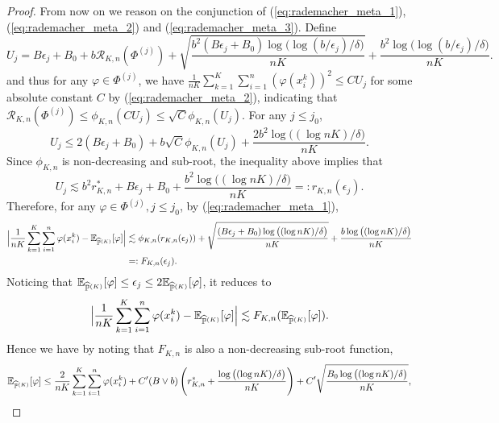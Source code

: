 \documentclass[11pt]{article}
\numberwithin{equation}{section}
\renewcommand{\P}{\mathbb{P}}
\renewcommand{\eqref}[1]{(\ref{#1})}
\begin{document}
\begin{proof}
    From now on we reason on the conjunction of \eqref{eq:rademacher_meta_1}, \eqref{eq:rademacher_meta_2} and \eqref{eq:rademacher_meta_3}.
    Define 
    \begin{equation}\label{eq:def_u_meta}
        U_j = B\epsilon_j+B_0+b\mathcal{R}_{K,n}(\Phi^{(j)})+\sqrt{\frac{b^2(B\epsilon_j+B_0)\log\big(\log(b/\epsilon_j)/\delta\big)}{nK}} + \frac{b^2\log\big(\log(b/\epsilon_j)/\delta\big)}{nK}.
    \end{equation}
    and thus for any $\varphi\in\Phi^{(j)}$, we have $\frac{1}{nK}\sum_{k=1}^K\sum_{i=1}^n(\varphi(x_i^k))^2\leq CU_j$ for some absolute constant $C$ by \eqref{eq:rademacher_meta_2}, indicating that
    $\mathcal{R}_{K,n}(\Phi^{(j)})\leq \phi_{K,n}(CU_j)\leq \sqrt{C}\phi_{K,n}(U_j)$.
    For any $j\leq j_0$,
    \begin{equation}
        U_j \leq 2(B\epsilon_j+B_0)+b\sqrt{C}\phi_{K,n}(U_j)+\frac{2b^2\log\big((\log nK)/\delta\big)}{nK}.
    \end{equation}
    Since $\phi_{K,n}$ is non-decreasing and sub-root, the inequality above implies that
    \begin{equation}
        U_j \lesssim b^2r_{K,n}^*+B\epsilon_j+B_0+\frac{b^2\log\big((\log nK)/\delta\big)}{nK}=:r_{K,n}(\epsilon_j).
    \end{equation}
    Therefore, for any $\varphi\in\Phi^{(j)},j\leq j_0$, by \eqref{eq:rademacher_meta_1},
    \begin{equation}
        \begin{aligned}
            \Big|\frac{1}{nK}\sum_{k=1}^K\sum_{i=1}^n\varphi(x_i^k)-\E_{\widehat{\P}^{(K)}}[\varphi]\Big| 
            &\lesssim \phi_{K,n}(r_{K,n}(\epsilon_j))+\sqrt{\frac{(B\epsilon_j+B_0)\log\big((\log nK)/\delta\big)}{nK}}+\frac{b\log\big((\log nK)/\delta\big)}{nK} \\
            &=: F_{K,n}(\epsilon_j).
        \end{aligned}
    \end{equation}
    Noticing that $\E_{\widehat{\P}^{(K)}}[\varphi]\leq \epsilon_j\leq 2\E_{\widehat{\P}^{(K)}}[\varphi]$, it reduces to
    \begin{equation}
        \Big|\frac{1}{nK}\sum_{k=1}^K\sum_{i=1}^n\varphi(x_i^k)-\E_{\widehat{\P}^{(K)}}[\varphi]\Big|\lesssim F_{K,n}(\E_{\widehat{\P}^{(K)}}[\varphi]).
    \end{equation}
    Hence we have by noting that $F_{K,n}$ is also a non-decreasing sub-root function, 
    \begin{align}
        &\E_{\widehat{\P}^{(K)}}[\varphi]\leq \frac{2}{nK}\sum_{k=1}^K\sum_{i=1}^n\varphi(x_i^k) + C'(B\vee b)\left(r_{K,n}^* + \frac{\log\big((\log nK)/\delta\big)}{nK}\right)+C'\sqrt{\frac{B_0\log\big((\log nK)/\delta\big)}{nK}},\\

\end{align}
\end{proof}
\end{document}
